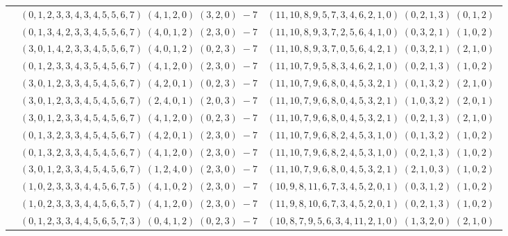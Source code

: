 \documentclass[11pt]{article}
\begin{document}
\begin{longtable}[l]{|c|c|c|}
 \cline{2-3} 
 & $(0 ,1 ,2 ,3 ,3 ,4 ,3 ,4 ,5 ,5 ,6 ,7) \;(4 ,1 ,2 ,0) \;(3 ,2 ,0) \;-7$ & $(11 ,10 ,8 ,9 ,5 ,7 ,3 ,4 ,6 ,2 ,1 ,0) \;(0 ,2 ,1 ,3) \;(0 ,1 ,2) \;$\\ 
 \cline{2-3} 
 & $(0 ,1 ,3 ,4 ,2 ,3 ,3 ,4 ,5 ,5 ,6 ,7) \;(4 ,0 ,1 ,2) \;(2 ,3 ,0) \;-7$ & $(11 ,10 ,8 ,9 ,3 ,7 ,2 ,5 ,6 ,4 ,1 ,0) \;(0 ,3 ,2 ,1) \;(1 ,0 ,2) \;$\\ 
 \cline{2-3} 
 & $(3 ,0 ,1 ,4 ,2 ,3 ,3 ,4 ,5 ,5 ,6 ,7) \;(4 ,0 ,1 ,2) \;(0 ,2 ,3) \;-7$ & $(11 ,10 ,8 ,9 ,3 ,7 ,0 ,5 ,6 ,4 ,2 ,1) \;(0 ,3 ,2 ,1) \;(2 ,1 ,0) \;$\\ 
 \cline{2-3} 
 & $(0 ,1 ,2 ,3 ,3 ,4 ,3 ,5 ,4 ,5 ,6 ,7) \;(4 ,1 ,2 ,0) \;(2 ,3 ,0) \;-7$ & $(11 ,10 ,7 ,9 ,5 ,8 ,3 ,4 ,6 ,2 ,1 ,0) \;(0 ,2 ,1 ,3) \;(1 ,0 ,2) \;$\\ 
 \cline{2-3} 
 & $(3 ,0 ,1 ,2 ,3 ,3 ,4 ,5 ,4 ,5 ,6 ,7) \;(4 ,2 ,0 ,1) \;(0 ,2 ,3) \;-7$ & $(11 ,10 ,7 ,9 ,6 ,8 ,0 ,4 ,5 ,3 ,2 ,1) \;(0 ,1 ,3 ,2) \;(2 ,1 ,0) \;$\\ 
 \cline{2-3} 
 & $(3 ,0 ,1 ,2 ,3 ,3 ,4 ,5 ,4 ,5 ,6 ,7) \;(2 ,4 ,0 ,1) \;(2 ,0 ,3) \;-7$ & $(11 ,10 ,7 ,9 ,6 ,8 ,0 ,4 ,5 ,3 ,2 ,1) \;(1 ,0 ,3 ,2) \;(2 ,0 ,1) \;$\\ 
 \cline{2-3} 
 & $(3 ,0 ,1 ,2 ,3 ,3 ,4 ,5 ,4 ,5 ,6 ,7) \;(4 ,1 ,2 ,0) \;(0 ,2 ,3) \;-7$ & $(11 ,10 ,7 ,9 ,6 ,8 ,0 ,4 ,5 ,3 ,2 ,1) \;(0 ,2 ,1 ,3) \;(2 ,1 ,0) \;$\\ 
 \cline{2-3} 
 & $(0 ,1 ,3 ,2 ,3 ,3 ,4 ,5 ,4 ,5 ,6 ,7) \;(4 ,2 ,0 ,1) \;(2 ,3 ,0) \;-7$ & $(11 ,10 ,7 ,9 ,6 ,8 ,2 ,4 ,5 ,3 ,1 ,0) \;(0 ,1 ,3 ,2) \;(1 ,0 ,2) \;$\\ 
 \cline{2-3} 
 & $(0 ,1 ,3 ,2 ,3 ,3 ,4 ,5 ,4 ,5 ,6 ,7) \;(4 ,1 ,2 ,0) \;(2 ,3 ,0) \;-7$ & $(11 ,10 ,7 ,9 ,6 ,8 ,2 ,4 ,5 ,3 ,1 ,0) \;(0 ,2 ,1 ,3) \;(1 ,0 ,2) \;$\\ 
 \cline{2-3} 
 & $(3 ,0 ,1 ,2 ,3 ,3 ,4 ,5 ,4 ,5 ,6 ,7) \;(1 ,2 ,4 ,0) \;(2 ,3 ,0) \;-7$ & $(11 ,10 ,7 ,9 ,6 ,8 ,0 ,4 ,5 ,3 ,2 ,1) \;(2 ,1 ,0 ,3) \;(1 ,0 ,2) \;$\\ 
 \cline{2-3} 
 & $(1 ,0 ,2 ,3 ,3 ,3 ,4 ,4 ,5 ,6 ,7 ,5) \;(4 ,1 ,0 ,2) \;(2 ,3 ,0) \;-7$ & $(10 ,9 ,8 ,11 ,6 ,7 ,3 ,4 ,5 ,2 ,0 ,1) \;(0 ,3 ,1 ,2) \;(1 ,0 ,2) \;$\\ 
 \cline{2-3} 
 & $(1 ,0 ,2 ,3 ,3 ,3 ,4 ,4 ,5 ,6 ,5 ,7) \;(4 ,1 ,2 ,0) \;(2 ,3 ,0) \;-7$ & $(11 ,9 ,8 ,10 ,6 ,7 ,3 ,4 ,5 ,2 ,0 ,1) \;(0 ,2 ,1 ,3) \;(1 ,0 ,2) \;$\\ 
 \cline{2-3} 
 & $(0 ,1 ,2 ,3 ,3 ,4 ,4 ,5 ,6 ,5 ,7 ,3) \;(0 ,4 ,1 ,2) \;(0 ,2 ,3) \;-7$ & $(10 ,8 ,7 ,9 ,5 ,6 ,3 ,4 ,11 ,2 ,1 ,0) \;(1 ,3 ,2 ,0) \;(2 ,1 ,0) \;$\\ 

\end{longtable}
\end{document}
